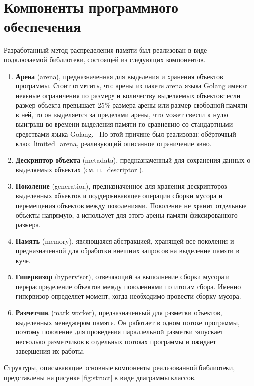 \section*{Компоненты программного обеспечения}

Разработанный метод распределения памяти был реализован в виде подключаемой библиотеки, состоящей из следующих компонентов.

\begin{enumerate}[label*=\arabic*.]
	\item \textbf{Арена} (arena), предназначенная для выделения и хранения объектов программы. Стоит отметить, что арены из пакета arena языка Golang имеют неявные ограничения по размеру и количеству выделяемых объектов: если размер объекта превышает 25\% размера арены или размер свободной памяти в ней, то он выделяется за пределами арены, что может свести к нулю выигрыш во времени выделения памяти по сравнению со стандартными средствами языка Golang.~\cite{golang_arena_limits} По этой причине был реализован обёрточный класс limited\_arena, реализующий описанное ограничение явно. 
	\item \textbf{Дескриптор объекта} (metadata), предназначенный для сохранения данных о выделяемых объектах (см. п. \ref{descriptor}).
	\item \textbf{Поколение} (generation), предназначенное для хранения дескрипторов выделенных объектов и поддерживающее операции сборки мусора и перемещения объектов между поколениями. Поколение не хранит отдельные объекты напрямую, а использует для этого арены памяти фиксированного размера.
	\item \textbf{Память} (memory), являющаяся абстракцией, хранящей все поколения и предназначенной для обработки внешних запросов на выделение памяти в куче.
	\item \textbf{Гипервизор} (hypervisor), отвечающий за выполнение сборки мусора и перераспределение объектов между поколениями по итогам сбора. Именно гипервизор определяет момент, когда необходимо провести сборку мусора.
	\item \textbf{Разметчик} (mark worker), предназначенный для разметки объектов, выделенных менеджером памяти. Он работает в одном потоке программы, поэтому поколение для проведения параллельной разметки запускает несколько разметчиков в отдельных потоках программы и ожидает завершения их работы.
\end{enumerate}

Структуры, описывающие основные компоненты реализованной библиотеки, представлены на рисунке \ref{fig:struct} в виде диаграммы классов.

